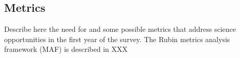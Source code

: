 \subsection{Metrics}

Describe here the need for and some possible  metrics that address science opportunities in the first year of the survey.
The Rubin metrics analysis framework (MAF) is described in XXX

